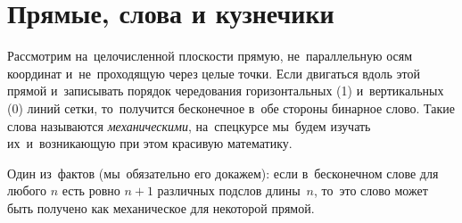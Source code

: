 
\section*{Прямые, слова и кузнечики}



Рассмотрим на~целочисленной плоскости прямую, не~параллельную осям координат
и~не~проходящую через целые точки.
Если двигаться вдоль этой прямой и~записывать порядок чередования
горизонтальных (1) и~вертикальных (0) линий сетки, то~получится бесконечное
в~обе стороны бинарное слово.
Такие слова называются \emph{механическими}, на~спецкурсе мы~будем изучать
их~и~возникающую при этом красивую математику.

\begin{minipage}{0.70\textwidth}
Один из~фактов (мы~обязательно его докажем): если в~бесконечном слове для
любого $n$ есть ровно $n + 1$ различных подслов длины~$n$, то~это слово может
быть получено как механическое для некоторой прямой.
\end{minipage}%
\hspace{0.05\textwidth}%
\begin{minipage}{0.25\textwidth}%
\end{minipage}

